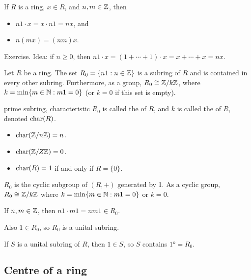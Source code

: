 \documentclass[12pt,letterpaper]{report}
\begin{document}
\begin{lem}{}{}
  If $R$ is a ring, $x \in R$, and $n, m \in \mathbb{Z}$, then
  \begin{itemize}
    \item $n1 \cdot x = x \cdot n1 = nx$, and
    \item $n(mx) = (nm)x$.
  \end{itemize}
\end{lem}

\begin{thmproof}
  Exercise.
  Idea: if $n \geq 0$, then $n1 \cdot x = (1 + \cdots + 1) \cdot x = x + \cdots + x = nx$.
\end{thmproof}

\begin{lem}{}{}
  Let $R$ be a ring.
  The set $R_0 = \{n1 : n \in \mathbb{Z}\}$ is a subring of $R$ and is contained in every other subring.
  Furthermore, as a group, $R_0 \cong \mathbb{Z}/{k}\mathbb{Z}$, where $k = \min\{m \in \mathbb{N} : m1 = 0\}$ (or $k = 0$
  if this set is empty).
\end{lem}

\begin{defn}{prime subring, characteristic}{}
  $R_0$ is called the  of $R$, and $k$ is called the  of
  $R$, denoted $\operatorname{char}(R)$.
\end{defn}

\begin{ex}
  \begin{itemize}
    \item $\operatorname{char}(\mathbb{Z}/{n}\mathbb{Z}) = n$.
    \item $\operatorname{char}(\mathbb{Z}/{Z}\mathbb{Z}) = 0$.
    \item $\operatorname{char}(R) = 1$ if and only if $R = \{0\}$.
  \end{itemize}
\end{ex}

\begin{thmproof}
  $R_0$ is the cyclic subgroup of $(R, +)$ generated by 1.
  As a cyclic group, $R_0 \cong \mathbb{Z}/{k}\mathbb{Z}$ where $k = \min\{m \in \mathbb{N} : m1 = 0\}$ or $k = 0$.

  If $n, m \in \mathbb{Z}$, then $n1 \cdot m1 = nm1 \in R_0$.

  Also $1 \in R_0$, so $R_0$ is a unital subring.

  If $S$ is a unital subring of $R$, then $1 \in S$, so $S$ contains $\ang{1} = R_0$.
\end{thmproof}

\pagebreak
\subsection{Centre of a ring}
\end{document}
